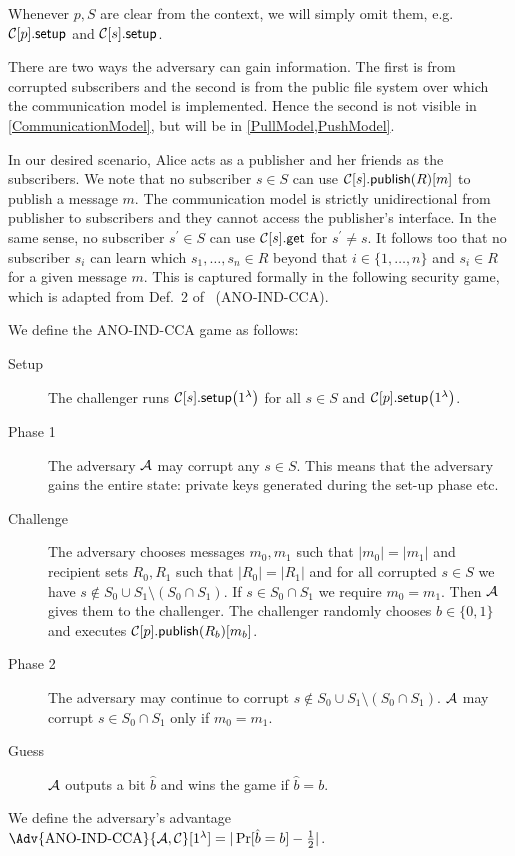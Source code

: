 Whenever \(p, S\) are clear from the context, we will simply omit them, e.g.\ 
\(\csetup{p}\) and \(\csetup{s}\).

There are two ways the adversary can gain information.
The first is from corrupted subscribers and the second is from the public file 
system over which the communication model is implemented.
Hence the second is not visible in \cref{CommunicationModel}, but will be in 
\cref{PullModel,PushModel}.

In our desired scenario, Alice acts as a publisher and her friends as the 
subscribers.
We note that no subscriber \(s\in S\) can use \(\cpub{s}[R][m]\) to publish 
a message \(m\).
The communication model is strictly unidirectional from publisher to 
subscribers and they cannot access the publisher's interface.
In the same sense, no subscriber \(s^\prime\in S\) can use \(\cget{s}\) for 
\(s^\prime\neq s\).
It follows too that no subscriber \(s_i\) can learn which \(s_1, \ldots, s_n\in 
  R\) beyond that \(i\in \{1, \ldots, n\}\) and \(s_i\in R\) for a given 
message \(m\).
This is captured formally in the following security game, which is adapted from 
Def.\ 2 of~\cite{ANOBE} (ANO-IND-CCA).

\begin{definition}\label{ANO-IND-CCA}
  We define the ANO-IND-CCA game as follows:
  \begin{description}
    \item[Setup] The challenger runs \(\csetup{s}[1^\lambda]\) for all \(s\in 
        S\) and \(\csetup{p}[1^\lambda]\).

    \item[Phase 1] The adversary \(\A\) may corrupt any \(s\in S\).
      This means that the adversary gains the entire state: private keys 
      generated during the set-up phase etc.

    \item[Challenge] The adversary chooses messages \(m_0, m_1\) such that 
      \(|m_0| = |m_1|\) and recipient sets \(R_0, R_1\) such that \(|R_0| 
        = |R_1|\) and for all corrupted \(s\in S\) we have \(s\notin S_0\cup 
        S_1\setminus (S_0\cap S_1)\).
      If \(s\in S_0\cap S_1\) we require \(m_0 = m_1\).
      Then \(\A\) gives them to the challenger.
      The challenger randomly chooses \(b\in \{0, 1\}\) and executes 
      \(\cpub{p}[R_b][m_b]\).

    \item[Phase 2] The adversary may continue to corrupt \(s\notin S_0\cup 
        S_1\setminus (S_0\cap S_1)\).
      \(\A\) may corrupt \(s\in S_0\cap S_1\) only if \(m_0 = m_1\).

    \item[Guess] \(\A\) outputs a bit \(\hat{b}\) and wins the game if 
      \(\hat{b} = b\).

  \end{description}
  We define the adversary's advantage \(\Adv{\text{ANO-IND-CCA}}{\A, 
      \Cop}[1^\lambda] = |\Pr[ \hat{b} = b ] - \frac{1}{2}|\).
\end{definition}

